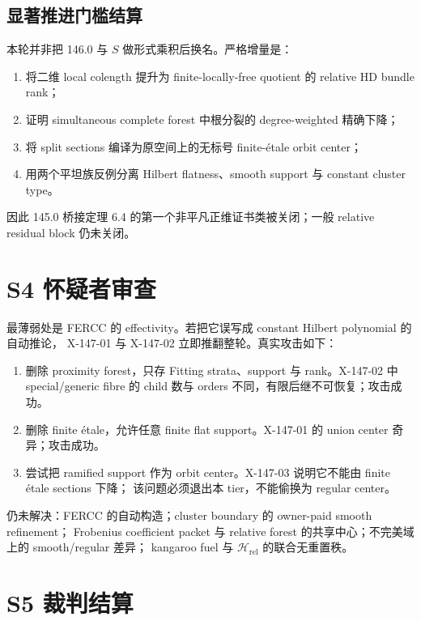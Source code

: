 \documentclass[11pt,a4paper,fontset=fandol]{ctexart}
\newcommand{\Hrel}{\mathscr H_{\mathrm{rel}}}
\begin{document}
\subsection{显著推进门槛结算}
本轮并非把 146.0 与 $S$ 做形式乘积后换名。严格增量是：
\begin{enumerate}
\item 将二维 local colength 提升为 finite-locally-free quotient 的 relative HD bundle rank；
\item 证明 simultaneous complete forest 中根分裂的 degree-weighted 精确下降；
\item 将 split sections 编译为原空间上的无标号 finite-étale orbit center；
\item 用两个平坦族反例分离 Hilbert flatness、smooth support 与 constant cluster type。
\end{enumerate}
因此 145.0 桥接定理 6.4 的第一个非平凡正维证书类被关闭；一般 relative residual block 仍未关闭。

\section{S4 怀疑者审查}
最薄弱处是 FERCC 的 effectivity。若把它误写成 constant Hilbert polynomial 的自动推论，
X-147-01 与 X-147-02 立即推翻整轮。真实攻击如下：
\begin{enumerate}
\item 删除 proximity forest，只存 Fitting strata、support 与 rank。X-147-02 中 special/generic
fibre 的 child 数与 orders 不同，有限后继不可恢复；攻击成功。
\item 删除 finite étale，允许任意 finite flat support。X-147-01 的 union center 奇异；攻击成功。
\item 尝试把 ramified support 作为 orbit center。X-147-03 说明它不能由 finite étale sections 下降；
该问题必须退出本 tier，不能偷换为 regular center。
\end{enumerate}
仍未解决：FERCC 的自动构造；cluster boundary 的 owner-paid smooth refinement；
Frobenius coefficient packet 与 relative forest 的共享中心；不完美域上的 smooth/regular 差异；
kangaroo fuel 与 $\Hrel$ 的联合无重置秩。

\section{S5 裁判结算}
\end{document}
